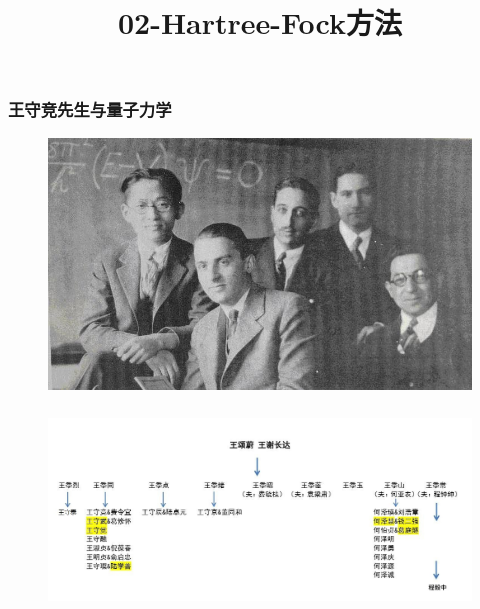 \frame
{
	\frametitle{王守竞先生与量子力学}
\begin{figure}[h!]
\centering
\vspace{-10.5pt}
\includegraphics[height=0.65\textwidth,width=1.0\textwidth,viewport=0 0 560 350,clip]{Figures/Collect_Wang.jpg}
\caption{\fontsize{7.2pt}{6.5pt}}
\label{Collect_Wang}
\end{figure}
}

\frame
{
	\frametitle{}
\begin{figure}[h!]
\centering
\hspace*{-10.5pt}
\includegraphics[height=0.42\textwidth,width=1.05\textwidth,viewport=0 0 860 350,clip]{Figures/Wang_Family_Suzhou.jpg}
\caption{\fontsize{6.2pt}{5.5pt}}
\label{Wang_Family}
\end{figure}
}

\title{02-{\rm Hartree-Fock}方法}
